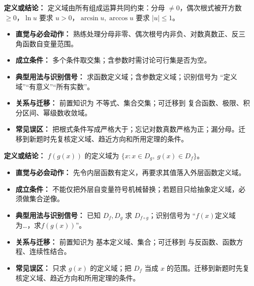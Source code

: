 \begin{knowledgeBox}
\textbf{定义或结论：} 定义域由所有组成运算共同约束：分母 $\ne0$，偶次根式被开方数 $\ge0$，$\ln u$ 要求 $u>0$，$\arcsin u,\arccos u$ 要求 $|u|\le1$。

\begin{itemize}
  \item \textbf{直觉与必会动作：} 熟练处理分母非零、偶次根号内非负、对数真数正、反三角函数自变量范围。
  \item \textbf{成立条件：} 多个条件取交集；含参数时需讨论可行集是否为空。
  \item \textbf{典型用法与识别信号：} 求函数定义域；含参数定义域；识别信号为 “定义域”“有意义”“所有实数”。
  \item \textbf{关系与迁移：} 前置知识为 不等式、集合交集；可迁移到 复合函数、极限、积分区间、幂级数收敛域。
  \item \textbf{常见误区：} 把根式条件写成严格大于；忘记对数真数严格为正；漏分母。迁移到新题时先复核定义域、趋近方向和所用定理的条件。
\end{itemize}
\end{knowledgeBox}

\begin{knowledgeBox}
\textbf{定义或结论：} $f(g(x))$ 的定义域为 $\{x:x\in D_g,\ g(x)\in D_f\}$。

\begin{itemize}
  \item \textbf{直觉与必会动作：} 先令内层函数有定义，再要求其值落入外层函数定义域。
  \item \textbf{成立条件：} 不能仅把外层自变量符号机械替换；若题目只给抽象定义域，必须做集合逆像。
  \item \textbf{典型用法与识别信号：} 已知 $D_f,D_g$ 求 $D_{f\circ g}$；识别信号为 “$f(x)$定义域为…，求$f(g(x))$”。
  \item \textbf{关系与迁移：} 前置知识为 基本定义域、集合；可迁移到 与反函数、函数方程、连续性结合。
  \item \textbf{常见误区：} 只求 $g(x)$ 的定义域；把 $D_f$ 当成 $x$ 的范围。迁移到新题时先复核定义域、趋近方向和所用定理的条件。
\end{itemize}
\end{knowledgeBox}


